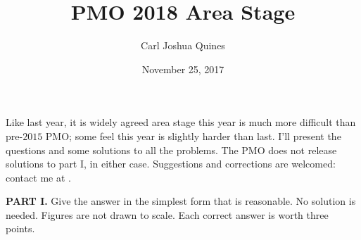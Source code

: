 \documentclass[11pt,paper=letter]{scrartcl}
\begin{document}
\title{PMO 2018 Area Stage}
\author{Carl Joshua Quines}
\date{November 25, 2017}

\maketitle

Like last year, it is widely agreed area stage this year is much more difficult than pre-$2015$ PMO; some feel this year is slightly harder than last. I'll present the questions and some solutions to all the problems. The PMO does not release solutions to part I, in either case. Suggestions and corrections are welcomed: contact me at .

\textbf{PART I.} Give the answer in the simplest form that is reasonable. No solution is needed. Figures are not drawn to scale. Each correct answer is worth three points.
\end{document}
